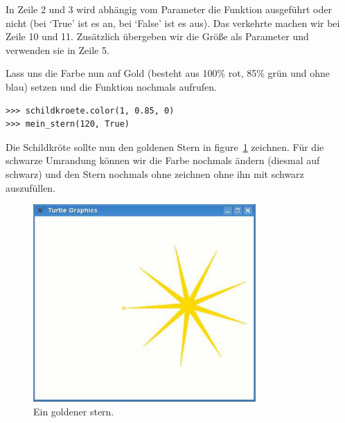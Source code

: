 In Zeile 2 und 3 wird abhängig vom Parameter  die Funktion  ausgeführt oder nicht (bei `True' ist es an, bei `False' ist es aus). Das verkehrte machen wir bei Zeile 10 und 11. Zusätzlich übergeben wir die Größe als Parameter und verwenden sie in Zeile 5.
\par
Lass uns die Farbe nun auf Gold (besteht aus 100\% rot, 85\% grün und ohne blau) setzen und die Funktion nochmals aufrufen.

\begin{Verbatim}[frame=single]
>>> schildkroete.color(1, 0.85, 0)
>>> mein_stern(120, True)
\end{Verbatim}

\noindent
Die Schildkröte sollte nun den goldenen Stern in figure~\ref{fig29} zeichnen. Für die schwarze Umrandung können wir die Farbe nochmals ändern (diesmal auf schwarz) und den Stern nochmals ohne zeichnen ohne ihn mit schwarz auszufüllen.

\begin{figure}
\begin{center}
\includegraphics[width=85mm]{images/figure29}
\end{center}
\caption{Ein goldener stern.}\label{fig29}
\end{figure}


